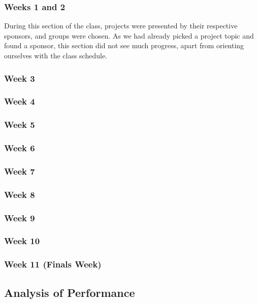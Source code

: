 \documentclass[draftclsnofoot,onecolumn,letterpaper,10pt]{IEEEtran}
\begin{document}
\subsubsection{Weeks 1 and 2}
During this section of the class, projects were presented by their respective sponsors, and groups were chosen.
As we had already picked a project topic and found a sponsor, this section did not see much progress, apart from orienting ourselves with the class schedule.

\subsubsection{Week 3} %

\subsubsection{Week 4} %

\subsubsection{Week 5} %

\subsubsection{Week 6}

\subsubsection{Week 7}

\subsubsection{Week 8}

\subsubsection{Week 9}

\subsubsection{Week 10}

\subsubsection{Week 11 (Finals Week)}


\subsection{Analysis of Performance}\label{sec:analysis}
\end{document}
